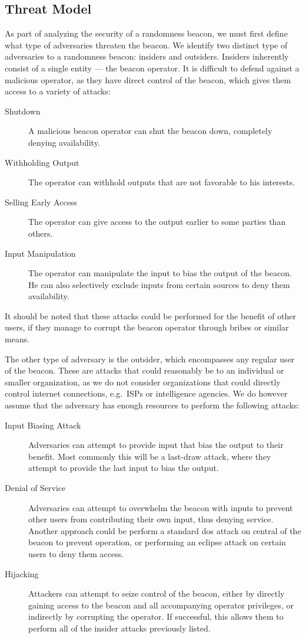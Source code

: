 \subsection{Threat Model}
As part of analyzing the security of a randomness beacon, we must first define what type of adversaries threaten the beacon. We identify two distinct type of adversaries to a randomness beacon: insiders and outsiders. Insiders inherently consist of a single entity --- the beacon operator. It is difficult to defend against a malicious operator, as they have direct control of the beacon, which gives them access to a variety of attacks:

\begin{description}
    \item [Shutdown] A malicious beacon operator can shut the beacon down, completely denying availability. 
    \item [Withholding Output] The operator can withhold outputs that are not favorable to his interests. 
    \item [Selling Early Access] The operator can give access to the output earlier to some parties than others.
    \item [Input Manipulation] The operator can manipulate the input to bias the output of the beacon. He can also selectively exclude inputs from certain sources to deny them availability. 

\end{description} 

It should be noted that these attacks could be performed for the benefit of other users, if they manage to corrupt the beacon operator through bribes or similar means. 

The other type of adversary is the outsider, which encompasses any regular user of the beacon. These are attacks that could reasonably be to an individual or smaller organization, as we do not consider organizations that could directly control internet connections, e.g.\ ISPs or intelligence agencies. We do however assume that the adversary has enough resources to perform the following attacks:

\begin{description}
    \item [Input Biasing Attack] Adversaries can attempt to provide input that bias the output to their benefit. Most commonly this will be a last-draw attack, where they attempt to provide the last input to bias the output. 
    \item [Denial of Service] Adversaries can attempt to overwhelm the beacon with inputs to prevent other users from contributing their own input, thus denying service. Another approach could be perform a standard \gls{dos} attack on central of the beacon to prevent operation, or performing an eclipse attack on certain users to deny them access. 
    \item [Hijacking] Attackers can attempt to seize control of the beacon, either by directly gaining access to the beacon and all accompanying operator privileges, or indirectly by corrupting the operator. If successful, this allows them to perform all of the insider attacks previously listed.  
\end{description}



